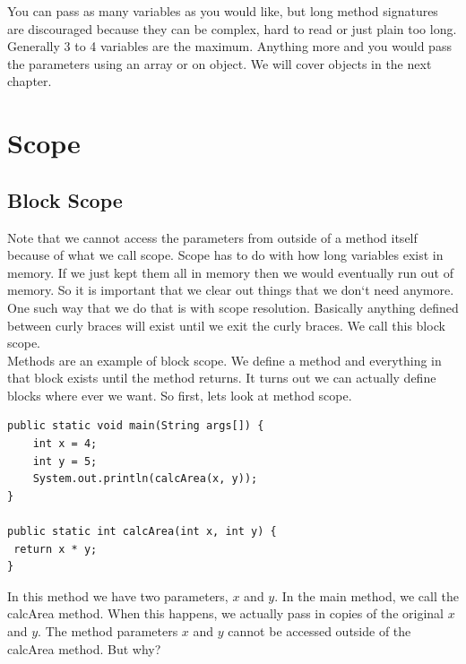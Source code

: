 \documentclass[11]{article}
\begin{document}
You can pass as many variables as you would like, but long method signatures are discouraged because they can be complex, hard to read or just plain too long. Generally 3 to 4 variables are the maximum. Anything more and you would pass the parameters using an array or on object. We will cover objects in the next chapter. \\

\section{Scope}
\subsection{Block Scope}
Note that we cannot access the parameters from outside of a method itself because of what we call scope. Scope has to do with how long variables exist in memory. If we just kept them all in memory then we would eventually run out of memory. So it is important that we clear out things that we don`t need anymore. One such way that we do that is with scope resolution. Basically anything defined between curly braces will exist until we exit the curly braces. We call this block scope.\\

Methods are an example of block scope. We define a method and everything in that block exists until the method returns. It turns out we can actually define blocks where ever we want. So first, lets look at method scope.

\begin{lstlisting}
public static void main(String args[]) {
	int x = 4;
	int y = 5;
	System.out.println(calcArea(x, y));
}

public static int calcArea(int x, int y) {
 return x * y;
}
\end{lstlisting}

In this method we have two parameters, $x$ and $y$. In the main method, we call the calcArea method. When this happens, we actually pass in copies of the original $x$ and $y$. The method parameters $x$ and $y$ cannot be accessed outside of the calcArea method. But why?\\
\end{document}
